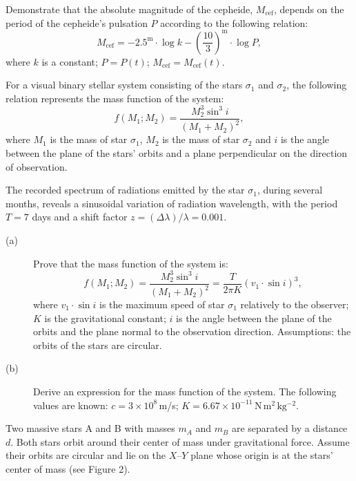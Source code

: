 Demonstrate that the absolute magnitude of the cepheide, $M_{\mathrm{cef}}$,
depends on the period of the cepheide's pulsation $P$ according to the
following relation:
\[ M_{\mathrm{cef}} = -2.5^{\mathrm{m}} \cdot \log k
   - \left(\frac{10}{3}\right)^{\mathrm{m}} \cdot \log P, \]
where $k$ is a constant; $P = P(t)$;
$M_{\mathrm{cef}} = M_{\mathrm{cef}}(t)$.


For a visual binary stellar system consisting of the stars $\sigma_1$ and
$\sigma_2$, the following relation represents the mass function of the
system:
\[ f(M_1; M_2) = \frac{M_2^3 \sin^3 i}{(M_1 + M_2)^2}, \]
where $M_1$ is the mass of star $\sigma_1$, $M_2$ is the mass of star
$\sigma_2$ and $i$ is the angle between the plane of the stars' orbits and a
plane perpendicular on the direction of observation.

The recorded spectrum of radiations emitted by the star $\sigma_1$, during
several months, reveals a sinusoidal variation of radiation wavelength, with
the period $T = 7$ days and a shift factor
$z = (\Delta\lambda)/\lambda = 0.001$.

\begin{description}
\item[(a)] Prove that the mass function of the system is:
  \[ f(M_1; M_2) = \frac{M_2^3 \sin^3 i}{(M_1 + M_2)^2}
     = \frac{T}{2\pi K} \left( v_1 \cdot \sin i \right)^3, \]
  where $v_1 \cdot \sin i$ is the maximum speed of star $\sigma_1$ relatively
  to the observer; $K$ is the gravitational constant; $i$ is the angle
  between the plane of the orbits and the plane normal to the observation
  direction. Assumptions: the orbits of the stars are circular.
\item[(b)] Derive an expression for the mass function of the system. The
  following values are known: $c = 3 \times 10^8$\,m/s;
  $K = 6.67 \times 10^{-11}\,\mathrm{N\,m^2\,kg^{-2}}$.
\end{description}


Two massive stars A and B with masses $m_A$ and $m_B$ are separated by a
distance $d$. Both stars orbit around their center of mass under
gravitational force. Assume their orbits are circular and lie on the
$X$--$Y$ plane whose origin is at the stars' center of mass (see Figure 2).

